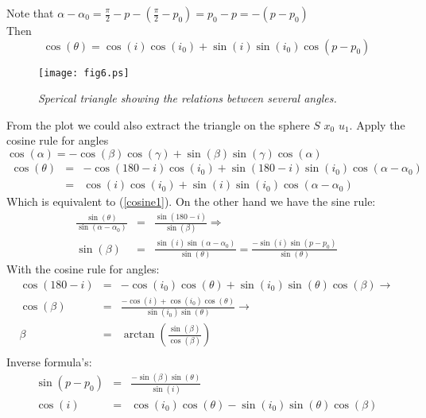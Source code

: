 \documentclass[11pt,a4paper]{article}
\newcommand{\sinb}[1]{\sin \left( #1 \right)}
\newcommand{\cosb}[1]{\cos \left( #1 \right)}
\begin{document}
Note that $\alpha - \alpha_{0} = \frac{\pi}{2} -p-\left( \frac{\pi}{2}-p_{0} \right) = p_{0}-p = - \left( p - p_{0} \right) $\\
Then \begin{equation}
\cosb{\theta} =\cosb{i} \cosb{i_{0}} + \sinb{i} \sinb{i_{0}} \cosb{p-p_{0}}
\label{cosine1}
\end{equation}


\begin{figure}[h]
   \centering
   \texttt{[image: fig6.ps]}
   \caption{\it Sperical triangle showing the relations between several angles.}
   \label{fig:fig6}
\end{figure}

 
From the plot we could also extract the triangle on the sphere $S$ $x_0$ $u_1$.  
Apply the cosine rule for angles 
$\cosb{ \alpha}   =  - \cosb{ \beta} \cosb {\gamma} + \sinb { \beta} \sinb {\gamma} \cosb {\alpha}$
\begin{eqnarray}
\cosb {\theta} &  = &  - \cosb {180 - i} \cosb {i_0} + \sinb {180-i} \sinb {i_0} \cosb {\alpha - \alpha_0} \nonumber \\
& = & \cosb {i} \cosb {i_0} + \sinb {i} \sinb {i_0} \cosb {\alpha - \alpha_0} \nonumber
\label{cosine2}
\end{eqnarray}
Which is equivalent to (\ref{cosine1}).
On the other hand we have the sine rule:
\begin{eqnarray}
\frac {\sinb {\theta}} {\sinb {\alpha - \alpha_0}} & = & \frac{\sinb{180 - i}}{\sinb {\beta}} \Rightarrow \nonumber  \\
\sinb {\beta} & = &\frac{\sinb {i} \sinb {\alpha - \alpha_0}} {\sinb {\theta}} = \frac{- \sinb {i} \sinb {p - p_0}}{\sinb {\theta}} \label{equation2}
\end{eqnarray}
With the cosine rule for angles:
\begin{eqnarray}
\cosb{180-i} & = & -\cosb {i_0} \cosb {\theta} + \sinb {i_0} \sinb {\theta} \cosb {\beta} \rightarrow \nonumber\\
\cosb {\beta} & = & \frac{- \cosb {i} + \cosb {i_0} \cosb {\theta}}{\sinb {i_0} \sinb {\theta}} \rightarrow \label{equation3} \\
\beta & = &  \arctan \left( \frac{\sinb {\beta}}{\cosb {\beta}} \right) \label{equation4} \\
\end{eqnarray}
Inverse formula's:
\begin{eqnarray}
\sinb{p - p_0} & = & \frac {-\sinb {\beta} \sinb {\theta}}{\sinb {i}} \label{equation5}\\
                  \cosb {i} & = & \cosb {i_0} \cosb {\theta} - \sinb {i_0} \sinb {\theta} \cosb {\beta} \label{equation6}
\end{eqnarray}
\end{document}
